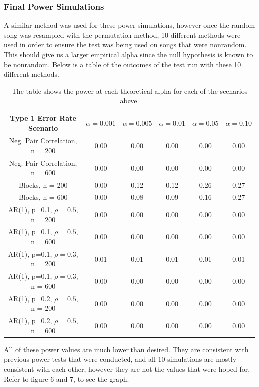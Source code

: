 \documentclass[12pt, letterpaper]{article}
\begin{document}
\subsubsection{Final Power Simulations}
A similar method was used for these power simulations, however once the random song was resampled with the permutation method, 10 different methods were used in order to ensure the test was being used on songs that were nonrandom. This should give us a larger empirical alpha since the null hypothesis is known to be nonrandom. Below is a table of the outcomes of the test run with these 10 different methods.
\begin{table}[h]
\begin{center}
\begin{tabular}{|c|c|c|c|c|c|}
\hline
\textbf{Type 1 Error Rate Scenario} & $\alpha = 0.001$ &  $\alpha = 0.005$ &  $\alpha = 0.01$ &  $\alpha = 0.05$ &  $\alpha = 0.10$ \\
\hline
Neg. Pair Correlation, n = 200 & 0.00 & 0.00 & 0.00 & 0.00 & 0.00 \\
\hline
Neg. Pair Correlation, n = 600 & 0.00 & 0.00 & 0.00 & 0.00 & 0.00 \\
\hline
Blocks, n = 200 & 0.00 & 0.12 & 0.12 & 0.26 & 0.27 \\
\hline
Blocks, n = 600 & 0.00 & 0.08 & 0.09 & 0.16 & 0.27 \\
\hline
AR(1), p=0.1, $\rho = 0.5$, n = 200 & 0.00 & 0.00 & 0.00 & 0.00 & 0.00 \\
\hline
AR(1), p=0.1, $\rho = 0.5$, n = 600 & 0.00 & 0.00 & 0.00 & 0.00 & 0.00 \\
\hline
AR(1), p=0.1, $\rho = 0.3$, n = 200 & 0.01 & 0.01 & 0.01 & 0.01 & 0.01 \\
\hline
AR(1), p=0.1, $\rho = 0.3$, n = 600 & 0.00 & 0.00 & 0.00 & 0.00 & 0.00 \\
\hline
AR(1), p=0.2, $\rho = 0.5$, n = 200 & 0.00 & 0.00 & 0.00 & 0.00 & 0.00 \\
\hline
AR(1), p=0.2, $\rho = 0.5$, n = 600 & 0.00 & 0.00 & 0.00 & 0.00 & 0.00 \\
\hline
\end{tabular}
\end{center}
\caption{The table shows the power at each theoretical alpha for each of the scenarios above.}
\label{fig: Power Simulations using Permutation Resampling}
\end{table}
All of these power values are much lower than desired. They are consistent with previous power tests that were conducted, and all 10 simulations are mostly consistent with each other, however they are not the values that were hoped for. Refer to figure 6 and 7, to see the graph.
\end{document}
